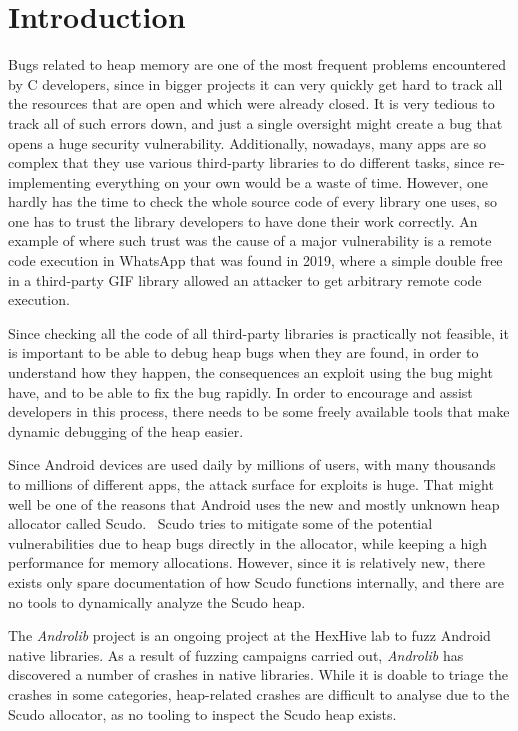 \documentclass[a4paper,11pt,oneside]{report}
\begin{document}
\chapter{Introduction}

Bugs related to heap memory are one of the most frequent problems encountered
by C developers, since in bigger projects it can very quickly get hard to track
all the resources that are open and which were already closed. It is very tedious
to track all of such errors down, and just a single oversight might create a bug
that opens a huge security vulnerability. Additionally, nowadays, many apps are so
complex that they use various third-party libraries to do different tasks, since
re-implementing everything on your own would be a waste of time. However, one
hardly has the time to check the whole source code of every library one uses, so
one has to trust the library developers to have done their work correctly. An
example of where such trust was the cause of a major vulnerability is a remote
code execution in WhatsApp that was found in 2019, where a simple double free
in a third-party GIF library allowed an attacker to get arbitrary remote code
execution.~\cite{whatsappRCE}

Since checking all the code of all third-party libraries is practically not
feasible, it is important to be able to debug heap bugs when they are found, in
order to understand how they happen, the consequences an exploit using the
bug might have, and to be able to fix the bug rapidly. In order to encourage
and assist developers in this process, there needs to be some freely available
tools that make dynamic debugging of the heap easier.

Since Android devices are used daily by millions of users, with many thousands to
millions of different apps, the attack surface for exploits is huge. That might
well be one of the reasons that Android uses the new and mostly unknown heap
allocator called Scudo.~\cite{llvmScudo} Scudo tries to mitigate some of the potential
vulnerabilities due to heap bugs directly in the allocator, while keeping a high
performance for memory allocations. However, since it is relatively new, there
exists only spare documentation of how Scudo functions internally, and there
are no tools to dynamically analyze the Scudo heap.

The \textit{Androlib} project is an ongoing 
project at the HexHive lab to fuzz Android native libraries.
As a result of fuzzing campaigns carried out, \textit{Androlib} has discovered a 
number of crashes in native libraries.
While it is doable to triage the crashes in some categories, heap-related
crashes are difficult to analyse due to the Scudo allocator, as no tooling 
to inspect the Scudo heap exists.
\end{document}
